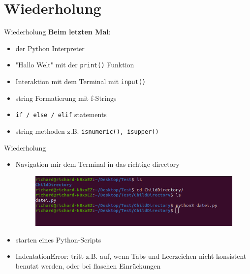 \section{Wiederholung}
\begin{frame}{Wiederholung}
	\textbf{Beim letzten Mal}:
	\begin{itemize}
		
		
		\item
		der Python Interpreter
		\item
		"Hallo Welt" mit der \alert{\texttt{print()}} Funktion 
		\item Interaktion mit dem Terminal mit \alert{\texttt{input()}}
		\item
		string Formatierung mit f-Strings
		
		\item \alert{\texttt{if / else / elif}} statements
		\item string methoden z.B. \alert{\texttt{isnumeric(), isupper()}}
		
		
	\end{itemize}
\end{frame}
\begin{frame}{Wiederholung}
	\begin{itemize}
		\item Navigation mir dem Terminal in das richtige directory
		\begin{figure}
			\includegraphics[width=\linewidth]{resources/02iteration/commandlinepython.png}
		\end{figure}
		
		\item
		starten eines Python-Scripts
		
		\item
		IndentationError: tritt z.B. auf, wenn Tabs und Leerzeichen nicht konsistent benutzt werden, oder bei flaschen Einrückungen
		
		
	\end{itemize}
\end{frame}

